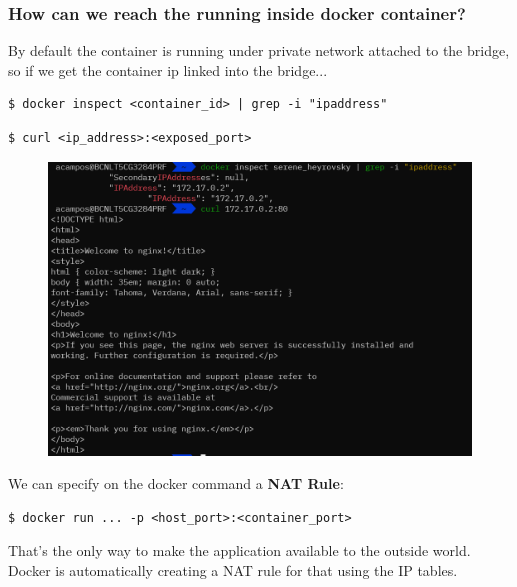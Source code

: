 \documentclass{article}
\newenvironment{codetemplate}[1][]{%
  \mybasecolorbox[#1]
  \itshape
}{%
  \endmybasecolorbox
}
\begin{document}
\subsubsection{How can we reach the running inside docker container?}
By default the container is running under private network attached to the bridge, so if we get the container ip linked into the bridge...
\begin{codetemplate}{}
\begin{verbatim}
$ docker inspect <container_id> | grep -i "ipaddress"
\end{verbatim}
\end{codetemplate}
\begin{codetemplate}{}
\begin{verbatim}
$ curl <ip_address>:<exposed_port>
\end{verbatim}
\end{codetemplate}

\begin{figure}[H]
    \centering
    \includegraphics[scale=0.6]{pictures/imageNG.png}
\end{figure}

We can specify on the docker command a \textbf{NAT Rule}:
\begin{codetemplate}{}
\begin{verbatim}
$ docker run ... -p <host_port>:<container_port>
\end{verbatim}
\end{codetemplate}

That's the only way to make the application available to the outside world. Docker is automatically creating a NAT rule for that using the IP tables.
\end{document}
